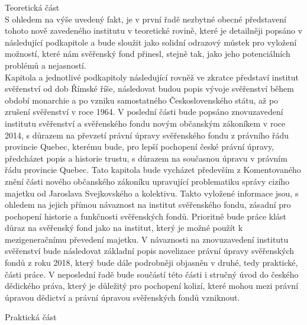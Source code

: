 \documentclass{article}
\begin{document}


{\Large Teoretická část}\\

S ohledem na výše uvedený fakt, je v první řadě nezbytné obecné představení tohoto nově zavedeného institutu v teoretické rovině, které je detailněji popsáno v následující podkapitole a bude sloužit jako solidní odrazový můstek pro vylož\-ení možností, které nám svěřenský fond přinesl, stejně tak, jako jeho potenciálních problémů a nejasností. \\

Kapitola a jednotlivé podkapitoly následující rovněž ve zkratce představí institut svěřenství od dob Římské říše, následovat budou popis vývoje svěřenství během období monarchie a po vzniku samostatného Československého státu, až po zrušení svěřenství v roce 1964. V poslední části bude popsáno znovuzavedení institutu svěřenství a svěřenského fondu novým občanským zá\-koníkem v roce 2014, s důrazem na převzetí právní úpravy svěřenského fondu z právního řádu provincie Quebec, kterému bude, pro lepší pochopení české právní úpravy, předcházet popis a historie trustu, s důrazem na současnou úpravu v právním řádu provincie Quebec. Tato kapitola bude vycházet především z Komentovaného znění části nového občanského zákoníku upravující problematiku správy cizího majetku od Jaroslava Svejkovského a kolektivu. Takto vyložené informace jsou, s ohledem na jejich přímou návaznost na institut svěřenského fondu, zásadní pro pochopení historie a funkčnosti svěřenských fondů. Prioritně bude práce klást důraz na svěřenský fond jako na institut, který je možné použít k mezigeneračnímu převedení majetku. V návaznosti na znovuzavedení institutu svěřenství bude následovat základní popis novelizace právní úpravy svěřenských fondů z roku 2018, který bude dále podrobněji objasněn v druhé, tedy praktické, části práce. V neposlední řadě bude součástí této části i stručný úvod do českého dědického práva, který je důležitý pro pochopení kolizí, které mohou mezi právní úpravou dědictví a právní úpravou svěřenských fondů vzniknout.\\


\newpage

{\Large Praktická část}\\
\end{document}
